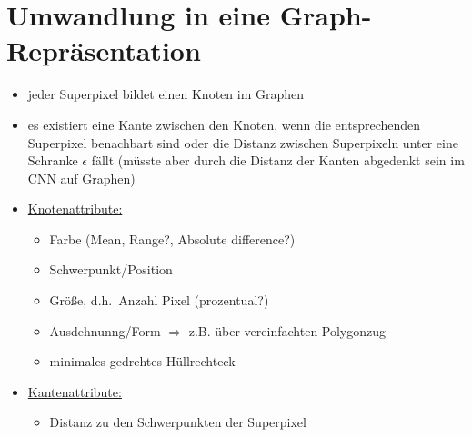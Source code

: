 \section{Umwandlung in eine Graph-Repräsentation}

\begin{itemize}
  \item jeder Superpixel bildet einen Knoten im Graphen
  \item es existiert eine Kante zwischen den Knoten, wenn die entsprechenden Superpixel benachbart sind oder die Distanz zwischen Superpixeln unter eine Schranke $\epsilon$ fällt (müsste aber durch die Distanz der Kanten abgedenkt sein im CNN auf Graphen)
  \item \underline{Knotenattribute:}
  \begin{itemize}
    \item Farbe (Mean, Range?, Absolute difference?)
    \item Schwerpunkt/Position
    \item Größe, d.h.\ Anzahl Pixel (prozentual?)
    \item Ausdehnunng/Form $\Rightarrow$ z.B. über vereinfachten Polygonzug
    \item minimales gedrehtes Hüllrechteck
  \end{itemize}
  \item \underline{Kantenattribute:}
  \begin{itemize}
    \item Distanz zu den Schwerpunkten der Superpixel
  \end{itemize}
\end{itemize}
